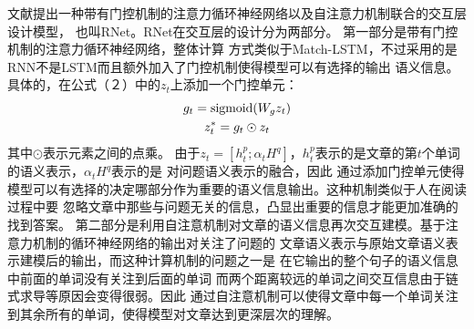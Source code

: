 文献\cite{RNet}提出一种带有门控机制的注意力循环神经网络以及自注意力机制联合的交互层设计模型，
也叫RNet。RNet在交互层的设计分为两部分。
第一部分是带有门控机制的注意力循环神经网络，整体计算
方式类似于Match-LSTM，不过采用的是RNN不是LSTM而且额外加入了门控机制使得模型可以有选择的输出
语义信息。具体的，在公式（２）中的$z_t$上添加一个门控单元：
\begin{gather}
    g_t=\text{sigmoid}(W_gz_t)\notag \\
    z_t^{*}=g_t\odot z_t
\end{gather}
其中$\odot$表示元素之间的点乘。
由于$z_t=[h_t^p;\alpha_tH^q]$，$h_t^p$表示的是文章的第$t$个单词的语义表示，$\alpha_tH^q$表示的是
对问题语义表示的融合，因此
通过添加门控单元使得模型可以有选择的决定哪部分作为重要的语义信息输出。这种机制类似于人在阅读过程中要
忽略文章中那些与问题无关的信息，凸显出重要的信息才能更加准确的找到答案。
第二部分是利用自注意机制对文章的语义信息再次交互建模。基于注意力机制的循环神经网络的输出对关注了问题的
文章语义表示与原始文章语义表示建模后的输出，而这种计算机制的问题之一是
在它输出的整个句子的语义信息中前面的单词没有关注到后面的单词
而两个距离较远的单词之间交互信息由于链式求导等原因会变得很弱。因此
通过自注意机制可以使得文章中每一个单词关注到其余所有的单词，使得模型对文章达到更深层次的理解。



